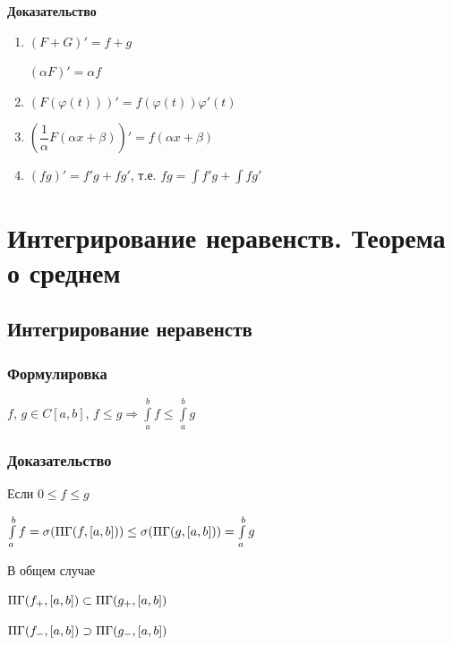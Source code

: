\documentclass{article}
\begin{document}
		\textbf{Доказательство}
		
		\begin{enumerate}
		
			\item $(F + G)' = f + g$
			
				$(\alpha F)' = \alpha f$
				
			\item $(F(\varphi(t)))' = f(\varphi(t))\varphi'(t)$
			
			\item $\left(\dfrac{1}{\alpha} F (\alpha x + \beta)\right)' = f(\alpha x + \beta)$
			
			\item $(fg)' = f'g + fg'$, т.е. $fg = \int f'g + \int fg'$
			
		\end{enumerate}
		
	\newpage
	
	\section{Интегрирование неравенств. Теорема о среднем}
	
		\subsection{Интегрирование неравенств}
		
			\subsubsection{Формулировка}
                
                $f$, $g \in C[a, b]$, $f \leq g \Rightarrow \int\limits^b_a f \leq \int\limits^b_a g$
			
            \subsubsection{Доказательство}
            
                Если $0 \leq f \leq g$
			
                $\int\limits^b_a f = \sigma (\Pi\Gamma (f, [a, b])) \leq \sigma (\Pi\Gamma (g, [a, b])) = \int\limits^b_a g$
			
                В общем случае
			
                $\Pi\Gamma(f_+, [a, b]) \subset \Pi\Gamma(g_+, [a, b])$
			
                $\Pi\Gamma(f_-, [a, b]) \supset \Pi\Gamma(g_-, [a, b])$
			
\end{document}
